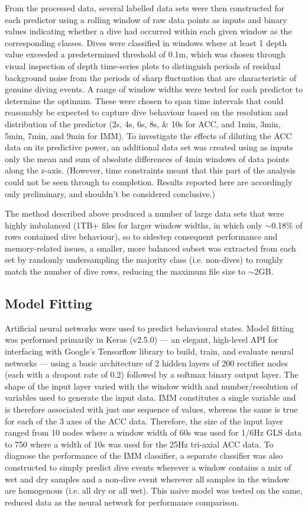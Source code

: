 \documentclass[11pt]{article}
\begin{document}
    
    From the processed data, several labelled data sets were then constructed for each predictor using a rolling window of raw data points as inputs and binary values indicating whether a dive had occurred within each given window as the corresponding classes. Dives were classified in windows where at least 1 depth value exceeded a predetermined threshold of 0.1m, which was chosen through visual inspection of depth time-series plots to distinguish periods of residual background noise from the periods of sharp fluctuation that are characteristic of genuine diving events. A range of window widths were tested for each predictor to determine the optimum. These were chosen to span time intervals that could reasonably be expected to capture dive behaviour based on the resolution and distribution of the predictor (2s, 4s, 6s, 8s, \& 10s for ACC, and 1min, 3min, 5min, 7min, and 9min for IMM). To investigate the effects of diluting the ACC data on its predictive power, an additional data set was created using as inputs only the mean and sum of absolute differences of 4min windows of data points along the z-axis. (However, time constraints meant that this part of the analysis could not be seen through to completion. Results reported here are accordingly only preliminary, and shouldn't be considered conclusive.)
    
    The method described above produced a number of large data sets that were highly imbalanced (1TB+ files for larger window widths, in which only $\sim$0.18\% of rows contained dive behaviour), so to sidestep consequent performance and memory-related issues, a smaller, more balanced subset was extracted from each set by randomly undersampling the majority class (i.e. non-dives) to roughly match the number of dive rows, reducing the maximum file size to $\sim$2GB. 
    

    \subsection{Model Fitting}
    Artificial neural networks were used to predict behavioural states. Model fitting was performed primarily in Keras (v2.5.0) — an elegant, high-level API for interfacing with Google's Tensorflow library to build, train, and evaluate neural networks — using a basic architecture of 2 hidden layers of 200 rectifier nodes (each with a dropout rate of 0.2) followed by a softmax binary output layer. The shape of the input layer varied with the window width and number/resolution of variables used to generate the input data. IMM constitutes a single variable and is therefore associated with just one sequence of values, whereas the same is true for each of the 3 axes of the ACC data. Therefore, the size of the input layer ranged from 10 nodes where a window width of 60s was used for 1/6Hz GLS data to 750 where a width of 10s was used for the 25Hz tri-axial ACC data. To diagnose the performance of the IMM classifier, a separate classifier was also constructed to simply predict dive events wherever a window contains a mix of wet and dry samples and a non-dive event wherever all samples in the window are homogenous (i.e. all dry or all wet). This naive model was tested on the same, reduced data as the neural network for performance comparison.
    
\end{document}
